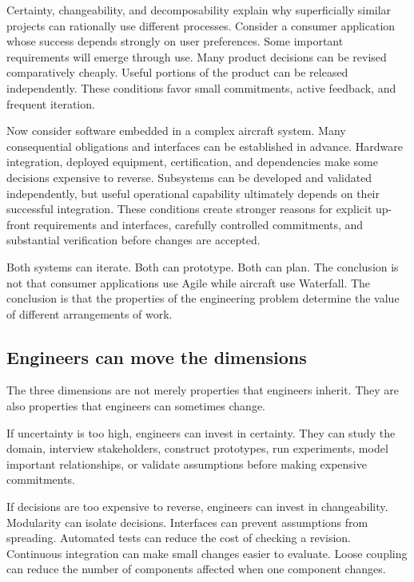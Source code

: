 Certainty, changeability, and decomposability explain why superficially similar projects can rationally
use different processes. Consider a consumer application whose success depends strongly on user
preferences. Some important
requirements will emerge through use. Many product decisions can be revised comparatively cheaply. Useful
portions of the product can be released independently. These conditions favor small commitments, active
feedback, and frequent iteration.

Now consider software embedded in a complex aircraft system. Many consequential obligations and
interfaces can be established in advance. Hardware integration, deployed equipment, certification, and
dependencies make some decisions expensive to reverse. Subsystems can be developed and validated
independently, but useful operational capability ultimately depends on their successful integration.
These conditions create stronger reasons for explicit up-front requirements and interfaces, carefully
controlled commitments, and substantial verification before changes are accepted.

Both systems can iterate. Both can prototype. Both can plan. The conclusion is not that consumer
applications use Agile while aircraft use Waterfall. The conclusion is that the properties of the
engineering problem determine the value of different arrangements of work.

\subsection{Engineers can move the dimensions}\label{sec-move-dimensions}

The three dimensions are not merely properties that engineers inherit. They are also properties that
engineers can sometimes change.

If uncertainty is too high, engineers can invest in certainty. They can study the domain, interview
stakeholders, construct prototypes, run experiments, model important relationships, or validate
assumptions before making expensive commitments.

If decisions are too expensive to reverse, engineers can invest in changeability. Modularity can isolate
decisions. Interfaces can prevent assumptions from spreading. Automated tests can reduce the cost of
checking a revision. Continuous integration can make small changes easier to evaluate. Loose coupling can
reduce the number of components affected when one component changes.

